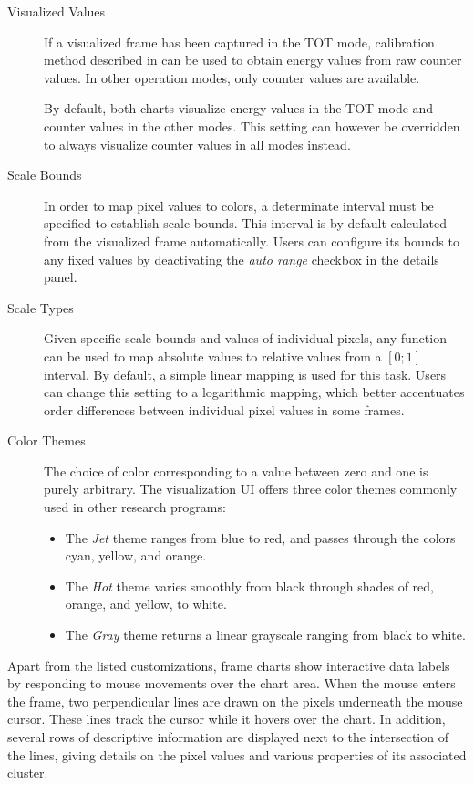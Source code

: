 \begin{description}
	\item[Visualized Values]
	If a visualized frame has been captured in the TOT mode, calibration method described in \cite{Jakubek2011S262} can be used to obtain energy values from raw counter values. In other operation modes, only counter values are available.

	By default, both charts visualize energy values in the TOT mode and counter values in the other modes. This setting can however be overridden to always visualize counter values in all modes instead.

	\item[Scale Bounds]
	In order to map pixel values to colors, a determinate interval must be specified to establish scale bounds. This interval is by default calculated from the visualized frame automatically. Users can configure its bounds to any fixed values by deactivating the \textit{auto range} checkbox in the details panel.

	\item[Scale Types]
	Given specific scale bounds and values of individual pixels, any function can be used to map absolute values to relative values from a $[0;1]$ interval. By default, a simple linear mapping is used for this task. Users can change this setting to a logarithmic mapping, which better accentuates order differences between individual pixel values in some frames.

	\item[Color Themes]
	The choice of color corresponding to a value between zero and one is purely arbitrary. The visualization UI offers three color themes commonly used in other research programs:

	\begin{itemize}
		\item The \textit{Jet} theme ranges from blue to red, and passes through the colors cyan, yellow, and orange.
		\item The \textit{Hot} theme varies smoothly from black through shades of red, orange, and yellow, to white.
		\item The \textit{Gray} theme returns a linear grayscale ranging from black to white.
	\end{itemize}
\end{description}

Apart from the listed customizations, frame charts show interactive data labels by responding to mouse movements over the chart area. When the mouse enters the frame, two perpendicular lines are drawn on the pixels underneath the mouse cursor. These lines track the cursor while it hovers over the chart. In addition, several rows of descriptive information are displayed next to the intersection of the lines, giving details on the pixel values and various properties of its associated cluster.

